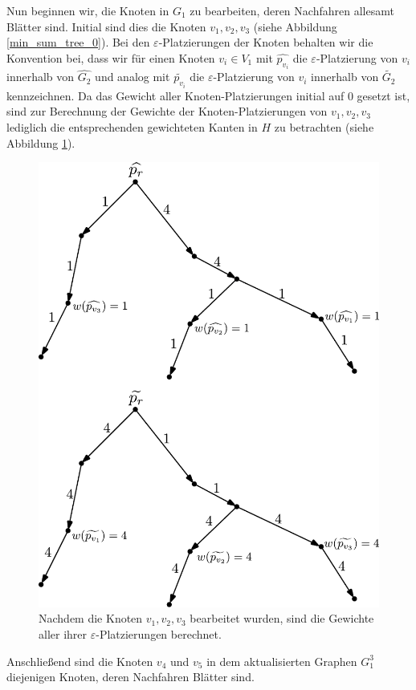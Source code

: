 \documentclass[a4paper, 12pt, twoside]{article}
\theoremstyle{Format1} %
\begin{document}
Nun beginnen wir, die Knoten in $G_1$ zu bearbeiten, deren Nachfahren allesamt Blätter sind. Initial sind dies die Knoten $v_1, v_2, v_3$ (siehe Abbildung \ref{min_sum_tree_0}).
Bei den $\varepsilon$-Platzierungen der Knoten behalten wir die Konvention bei, dass wir für einen Knoten $v_i \in V_1$ mit $\widehat{p_{v_i}}$ die $\varepsilon$-Platzierung von $v_i$ innerhalb
von $\widehat{G_2}$ und analog mit $\widetilde{p_{v_i}}$ die $\varepsilon$-Platzierung von $v_i$ innerhalb von $\widetilde{G_2}$ kennzeichnen. Da das Gewicht aller Knoten-Platzierungen initial auf 0 gesetzt ist,
sind zur Berechnung der Gewichte der Knoten-Platzierungen von $v_1,v_2,v_3$ lediglich die entsprechenden gewichteten Kanten in $H$ zu betrachten (siehe Abbildung \ref{min_sum_tree_iteration_0}).

\begin{figure}[H]
	\centering
	\includegraphics[width=0.8\linewidth]{min_sum_tree_h_0.pdf}
	\caption{
		Nachdem die Knoten $v_1,v_2,v_3$ bearbeitet wurden, sind die Gewichte aller ihrer $\varepsilon$-Platzierungen berechnet.
	}
	\label{min_sum_tree_iteration_0}
\end{figure}

Anschließend sind die Knoten $v_4$ und $v_5$ in dem aktualisierten Graphen $G_1^3$ diejenigen Knoten, deren Nachfahren Blätter sind.
\end{document}
